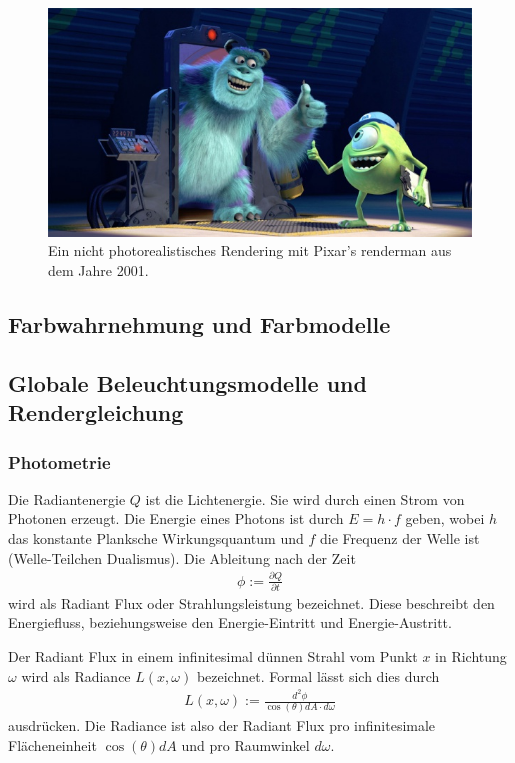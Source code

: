  \begin{figure}[H]
    \centering
    \includegraphics[height=0.5\textwidth]{images/pixar.jpg}
    \caption{Ein nicht photorealistisches Rendering mit Pixar's renderman aus dem Jahre 2001.}
    \label{fig:cray}
\end{figure}

\subsection{Farbwahrnehmung und Farbmodelle}
\subsection{Globale Beleuchtungsmodelle und Rendergleichung}
\subsubsection{Photometrie}
Die Radiantenergie $Q$ ist die Lichtenergie. Sie wird durch einen Strom von Photonen erzeugt. Die Energie eines Photons ist 
durch $E=h \cdot f$ geben, wobei $h$ das konstante Planksche Wirkungsquantum und $f$ die Frequenz der Welle ist (Welle-Teilchen Dualismus).  
Die Ableitung nach der Zeit
\begin{align}
\phi := \frac{\partial Q}{\partial t}
\end{align}
wird als Radiant Flux oder Strahlungsleistung bezeichnet. Diese  beschreibt den Energiefluss, beziehungsweise den Energie-Eintritt und Energie-Austritt.

Der Radiant Flux in einem infinitesimal dünnen Strahl vom Punkt $x$ in Richtung $\omega$ wird als Radiance $L(x, \omega)$ bezeichnet.  Formal lässt sich dies durch 
\begin{align}
L(x, \omega) := \frac{d^2 \phi}{\cos(\theta) dA \cdot d\omega}
\end{align}
ausdrücken. Die Radiance ist also der Radiant Flux pro infinitesimale Flächeneinheit $\cos(\theta) dA$ und pro  Raumwinkel $d \omega$.

